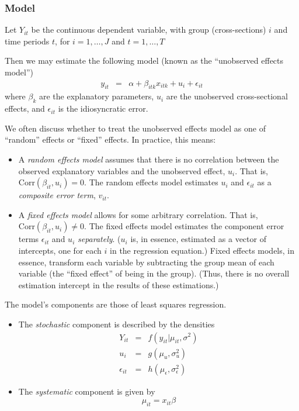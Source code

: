 \subsubsection{Model}
Let \(Y_{it}\) be the continuous dependent variable, with group (cross-sections) \(i\) and time periods \(t\), for \(i=1,\ldots,J\) and \(t=1,\ldots,T\)

Then we may estimate the following model (known as the ``unobserved effects model'')
\begin{eqnarray*}
y_{it}	&	=	&	\alpha + \beta_{itk}x_{itk} + u_i + \epsilon_{it}
\end{eqnarray*}
where \(\beta_k\) are the explanatory parameters, \(u_i\) are the unobserved cross-sectional effects, and \(\epsilon_{it}\) is the idiosyncratic error.

We often discuss whether to treat the unobserved effects model as one of ``random'' effects or ``fixed'' effects. In practice, this means:
\begin{itemize}
\item 	A \emph{random effects model} assumes that there is no correlation between the observed explanatory variables and the unobserved effect, \(u_i\). That is, \(\mathrm{Corr}(\beta_{it},u_i) = 0\). The random effects model estimates \(u_i\) and \(\epsilon_{it}\) as a \emph{composite error term}, \(v_{it}\).
\item	A \emph{fixed effects model} allows for some arbitrary correlation. That is, \(\mathrm{Corr}(\beta_{it}, u_i) \neq 0\). The fixed effects model estimates the component error terms \(\epsilon_{it}\) and \(u_i\) \emph{separately}. (\(u_i\) is, in essence, estimated as a vector of intercepts, one for each \(i\) in the regression equation.) Fixed effects models, in essence, transform each variable by subtracting the group mean of each variable (the ``fixed effect'' of being in the group). (Thus, there is no overall estimation intercept in the results of these estimations.)
\end{itemize}

The model's components are those of least squares regression.
\begin{itemize}
\item The \emph{stochastic} component is described by the densities %
\begin{eqnarray*}
Y_{it}	&	=	&	f(y_{it}|\mu_{it}, \sigma^2) \\
u_i		&	=	&	g(\mu_u, \sigma^2_u)\\
\epsilon_{it}	&	=	&	h(\mu_\epsilon, \sigma^2_\epsilon)
\end{eqnarray*}



\item The \emph{systematic} component is given by
\[\mu_{it} = x_{it}\beta\]
\end{itemize}


